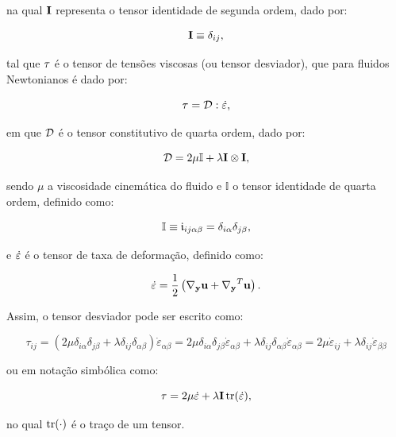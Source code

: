 \documentclass[_ArquivoPrincipal.tex]{subfiles}
\begin{document}
\noindent na qual $\mathbf{I}$ representa o tensor identidade de segunda ordem, dado por:

\begin{equation}
    \mathbf{I}\equiv\delta_{ij}\text{,}
\end{equation}

\noindent tal que $\mathbf{\tau}$ é o tensor de tensões viscosas (ou tensor desviador), que para fluidos Newtonianos é dado por:

\begin{equation}
    \mathbf{\tau}=\mathcal{D}:\dot{\mathbf{\varepsilon}}\text{,}
\end{equation}

\noindent em que $\mathcal{D}$ é o tensor constitutivo de quarta ordem, dado por:

\begin{equation}
    \mathcal{D}=2\mu\mathbb{I}+\lambda\mathbf{I}\otimes\mathbf{I}\text{,}
\end{equation}

\noindent sendo $\mu$ a viscosidade cinemática do fluido e $\mathbb{I}$ o tensor identidade de quarta ordem, definido como:

\begin{equation}
    \mathbb{I}\equiv\frak{i}_{ij\alpha\beta}=\delta_{i\alpha}\delta_{j\beta}\text{,}
\end{equation}

\noindent e $\dot{\mathbf{\varepsilon}}$ é o tensor de taxa de deformação, definido como:

\begin{equation}
    \dot{\mathbf{\varepsilon}}=\frac{1}{2}\left(\mathbf{\nabla_y}\mathbf{u}+\mathbf{\nabla_y}^T\mathbf{u}\right)\text{.}\label{eq:deftax1}
\end{equation}

Assim, o tensor desviador pode ser escrito como:

\[\tau_{ij}=(2\mu\delta_{i\alpha}\delta_{j\beta}+\lambda\delta_{ij}\delta_{\alpha\beta})\dot{\varepsilon}_{\alpha\beta}=2\mu\delta_{i\alpha}\delta_{j\beta}\dot{\varepsilon}_{\alpha\beta}+\lambda\delta_{ij}\delta_{\alpha\beta}\dot{\varepsilon}_{\alpha\beta}=2\mu\dot{\varepsilon}_{ij}+\lambda\delta_{ij}\dot{\varepsilon}_{\beta\beta}\]

\noindent ou em notação simbólica como:

\begin{equation}
    \mathbf{\tau}=2\mu\dot{\mathbf{\varepsilon}}+\lambda\mathbf{I}\mathop{\mathrm{tr}}\nolimits(\dot{\mathbf{\varepsilon}})\text{,}
\end{equation}

\noindent no qual $\mathop{\mathrm{tr}}\nolimits(\cdot)$ é o traço de um tensor.
\end{document}
